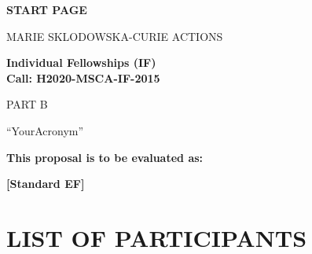 \documentclass[a4paper,11pt]{article}
\newcommand{\acronym}{{\sc YourAcronym}\xspace}
\begin{document}
\phantom{a}
\vspace{15mm}
\begin{center}


        \Large{
      
     
        \textbf{START PAGE}
  
          \vspace{15mm}
          MARIE SKLODOWSKA-CURIE ACTIONS\\
          \vspace{1cm}
          
          \textbf{Individual Fellowships (IF)}\\
          \textbf{Call: H2020-MSCA-IF-2015}
          \vspace{2cm}                   

          PART B
          \vspace{2.5cm}

          ``\acronym''
          \vspace{2cm}

          \textbf{This proposal is to be evaluated as:}
          \vspace{.5cm}

          \textbf{[Standard EF]}
        }

  \end{center}
\vspace{1cm}

\newpage
\setcounter{tocdepth}{1}
\setcounter{section}{-1}
\tableofcontents


\newpage
\section{LIST OF PARTICIPANTS}
\label{sec:participants}

\newcommand\rotx[1]{\rotatebox[origin=c]{90}{\textbf{#1}}}
\newcommand\roty[1]{\rotatebox[origin=c]{90}{\parbox{4cm}{\raggedright\textbf{#1}}}}
\newcommand\MyHead[2]{\multicolumn{1}{l|}{\parbox{#1}{\centering #2}}}
\end{document}
